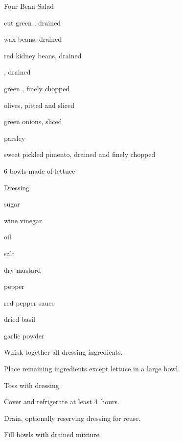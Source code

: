 \begin{recipe}{Four Bean Salad}{}{}

\begin{ingredients}
\item {} cut green , drained
\item {} wax beans, drained
\item {} red kidney beans, drained
\item {} , drained
\item \C{\half} green , finely chopped
\item \C{\half} olives, pitted and sliced
\item \C{\quarter} green onions, sliced
\item \C{\quarter} parsley
\item \C{\quarter} sweet pickled pimento, drained and finely chopped
\item 6 bowls made of lettuce 
\end{ingredients}
Dressing
\begin{ingredients}
\item \C{\half} sugar
\item \C{\half} wine vinegar
\item \C{\half} oil
\item \tp{1\half} salt
\item \tp{\half} dry mustard
\item \tp{\half} pepper
\item \tp{\half} red pepper sauce
\item \tp{\quarter} dried basil
\item \tp{\quarter} garlic powder
\end{ingredients}

\begin{directions}
\item Whisk together all dressing ingredients.
\item Place remaining ingredients except lettuce in a large bowl.
\item Toss with dressing.
\item Cover and refrigerate at least 4~hours.
\item Drain, optionally reserving dressing for reuse.
\item Fill bowls with drained mixture.
\end{directions}

\end{recipe}
